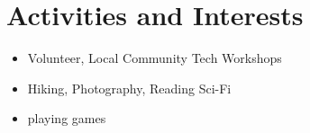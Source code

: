 \documentclass[a4paper,10pt]{article}
\begin{document}
\vspace{0.5cm}

\section*{Activities and Interests}
\begin{itemize}
    \item Volunteer, Local Community Tech Workshops
    \item Hiking, Photography, Reading Sci-Fi
    \item playing games
\end{itemize}
\end{document}

